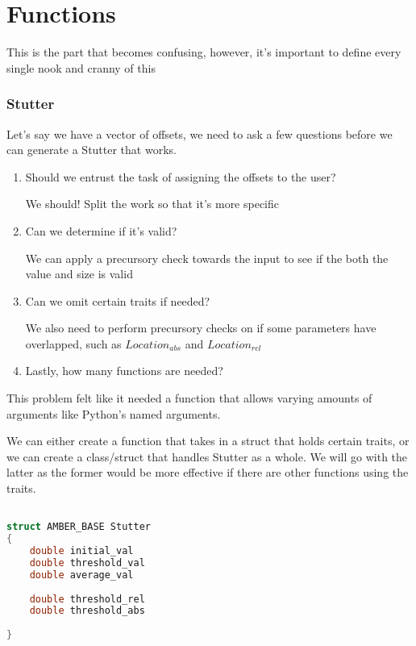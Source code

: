 \part{Functions}

This is the part that becomes confusing, however, it's important to define every single nook and cranny of this 

\section{Stutter}

Let's say we have a vector of offsets, we need to ask a few questions before we can generate a Stutter that works.

\begin{enumerate}
	\item Should we entrust the task of assigning the offsets to the user?
	
	We should! Split the work so that it's more specific
	\item Can we determine if it's valid?
	
	We can apply a precursory check towards the input to see if the both the value and size is valid
	
	\item Can we omit certain traits if needed?
	
	We also need to perform precursory checks on if some parameters have overlapped, such as $Location_{abs}$ and $Location_{rel}$
	
	\item Lastly, how many functions are needed?
\end{enumerate}

This problem felt like it needed a function that allows varying amounts of arguments like Python's named arguments.

We can either create a function that takes in a struct that holds certain traits, or we can create a class/struct that handles Stutter as a whole. We will go with the latter as the former would be more effective if there are other functions using the traits.

\begin{lstlisting}[language=C++]

struct AMBER_BASE Stutter
{
	double initial_val
	double threshold_val
	double average_val
	
	double threshold_rel
	double threshold_abs
	
}


\end{lstlisting}


